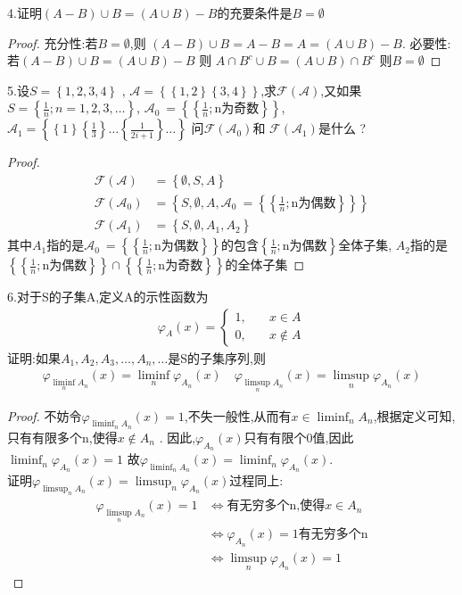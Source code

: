 4.证明\((A-B) \cup B = (A \cup B) - B\)的充要条件是\(B=\emptyset\)
\begin{proof}
    充分性:若\(B = \emptyset\),则 \((A -B) \cup B = A-B = A = (A \cup B) -B\). 
    必要性:若\((A-B) \cup B = (A \cup B) - B\) 则 \(A\cap B^{c} \cup B = (A \cup B) \cap B^{c}\) 则\(B =\emptyset\)
\end{proof}
5.设\(S = \left\{1,2,3,4\right\}\) , \(\mathscr{A} = \left\{\left\{1,2\right\}\left\{3,4\right\}\right\}\),求\(\mathscr{F}(\mathscr{A})\),又如果\(S = \left\{\frac{1}{n} ; n=1,2,3 , \dots \right\} \), \(\mathscr{A}_0\ = \left\{\left\{\frac{1}{n}; \text{n为奇数}\right\}\right\}\), \(\mathscr{A}_1 = \left\{\left\{1\right\}\left\{\frac{1}{3}\right\} \dots \left\{\frac{1}{2i+1}\right\}\dots \right\}\)
问\(\mathscr{F} (\mathscr{A}_0)\)和 \(\mathscr{F}(\mathscr{A}_1)\)是什么 ? 
\begin{proof}
    \begin{align*}
        \mathscr{F}(\mathscr{A})&= \left\{\emptyset , S , A \right\} \\ 
        \mathscr{F}(\mathscr{A}_0)&= \left\{S , \emptyset , A, \mathscr{A}_0\ = \left\{\left\{\frac{1}{n}; \text{n为偶数}\right\}\right\}\right\} \\ 
        \mathscr{F}(\mathscr{A}_1) &= \left\{S, \emptyset, A_1 ,A_2\right\}
    \end{align*}
    其中\(A_1\)指的是\(\mathscr{A}_0\ = \left\{\left\{\frac{1}{n}; \text{n为偶数}\right\}\right\}\)的包含\(\left\{\frac{1}{n} ; \text{n为偶数}\right\}\)全体子集, \(A_2\)指的是\( \left\{\left\{\frac{1}{n}; \text{n为偶数}\right\}\right\} \cap  \left\{\left\{\frac{1}{n}; \text{n为奇数}\right\}\right\}\)的全体子集
\end{proof}
6.对于S的子集A,定义A的示性函数为
\begin{align}
\varphi_{A}(x) = \begin{cases}
    1,\quad &x\in A \\ 
    0,\quad &x \notin A 
\end{cases}    
\end{align}
证明:如果\(A_1,A_2,A_3 , \dots ,A_n ,\dots \)是S的子集序列,则 \begin{align*}
    \varphi_{\liminf_{n}A_n}(x) = \liminf_{n} \varphi_{A_n} (x) \quad  \varphi_{\limsup_{n}A_n}(x) = \limsup_{n} \varphi_{A_n} (x)
\end{align*}
\begin{proof}
    不妨令\(\varphi_{\liminf_{n} A_n}(x) = 1 \),不失一般性,从而有\(x \in \liminf_{n}A_n\),根据定义可知,只有有限多个n,使得\(x \notin A_n\) . 因此,\(\varphi_{A_n}(x)\)只有有限个0值,因此\(\liminf_{n}\varphi_{A_n}(x) = 1 \)
    故\(\varphi_{\liminf_{n}A_n}(x) =\liminf_{n}\varphi_{A_n}(x)\).
    \\ 
    证明\(\varphi_{\limsup_{n}A_n}(x) = \limsup_{n} \varphi_{A_n} (x)\)过程同上:\begin{align*}
        \varphi_{\limsup_{n}A_n }(x) = 1 &\Leftrightarrow  \text{有无穷多个n,使得} x \in A_n \\ 
        &\Leftrightarrow\varphi_{A_n}(x) =1 \text{有无穷多个n} \\ 
        &\Leftrightarrow \limsup_{n}\varphi_{A_n}(x) = 1
    \end{align*}
\end{proof}
